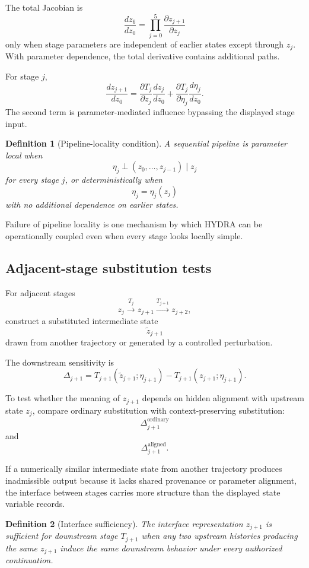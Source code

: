 \documentclass[11pt]{article}
\newtheorem{definition}{Definition}[section]
\theoremstyle{definition}
\begin{document}
The total Jacobian is
\[
\frac{d z_6}{d z_0}
=
\prod_{j=0}^{5}
\frac{\partial z_{j+1}}{\partial z_j}
\]
only when stage parameters are independent of earlier states except through \(z_j\). With parameter dependence, the total derivative contains additional paths.

For stage \(j\),
\[
\frac{d z_{j+1}}{d z_0}
=
\frac{\partial T_j}{\partial z_j}
\frac{d z_j}{d z_0}
+
\frac{\partial T_j}{\partial\eta_j}
\frac{d\eta_j}{d z_0}.
\]
The second term is parameter-mediated influence bypassing the displayed stage input.

\begin{definition}[Pipeline-locality condition]
A sequential pipeline is parameter local when
\[
\eta_j\perp(z_0,\ldots,z_{j-1})
\mid z_j
\]
for every stage \(j\), or deterministically when
\[
\eta_j=\eta_j(z_j)
\]
with no additional dependence on earlier states.
\end{definition}

Failure of pipeline locality is one mechanism by which HYDRA can be operationally coupled even when every stage looks locally simple.

\subsection{Adjacent-stage substitution tests}

For adjacent stages
\[
z_j\xrightarrow{T_j}z_{j+1}\xrightarrow{T_{j+1}}z_{j+2},
\]
construct a substituted intermediate state
\[
\widetilde z_{j+1}
\]
drawn from another trajectory or generated by a controlled perturbation.

The downstream sensitivity is
\[
\Delta_{j+1}
=
T_{j+1}(\widetilde z_{j+1};\eta_{j+1})
-
T_{j+1}(z_{j+1};\eta_{j+1}).
\]

To test whether the meaning of \(z_{j+1}\) depends on hidden alignment with upstream state \(z_j\), compare ordinary substitution with context-preserving substitution:
\[
\Delta_{j+1}^{\mathrm{ordinary}}
\]
and
\[
\Delta_{j+1}^{\mathrm{aligned}}.
\]

If a numerically similar intermediate state from another trajectory produces inadmissible output because it lacks shared provenance or parameter alignment, the interface between stages carries more structure than the displayed state variable records.

\begin{definition}[Interface sufficiency]
The interface representation \(z_{j+1}\) is sufficient for downstream stage \(T_{j+1}\) when any two upstream histories producing the same \(z_{j+1}\) induce the same downstream behavior under every authorized continuation.
\end{definition}
\end{document}
